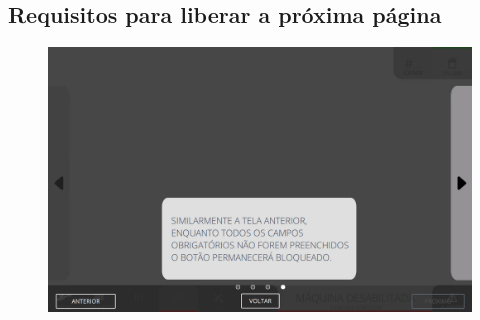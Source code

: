 \thispagestyle{fancy}
\vspace{\fill}
\subsection{\small Requisitos para liberar a próxima página}
\begin{figure}
    \centering
    \includegraphics[width=576 px,height=360 px]{src/imagesICV/09-request/new/e-9.png}
\end{figure}
